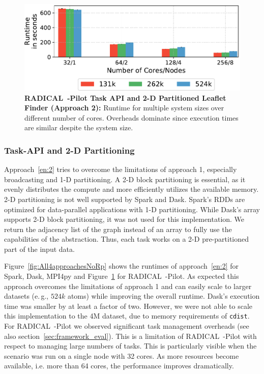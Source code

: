 

\begin{figure}[ht]
    \centering
    \includegraphics[width=.95\textwidth]{figures/data_analytics_hpc/task_par/rpLF.pdf}
    \caption{\textbf{RADICAL~-Pilot Task API and 2-D Partitioned Leaflet Finder (Approach 2):}
    Runtime for multiple system sizes over different number of cores.
    Overheads dominate since execution times are similar despite the system size.}
    \label{fig:rpLF}
\end{figure}

\subsubsection{Task-API and 2-D Partitioning}
Approach~\ref{en:2} tries to overcome the limitations of approach 1, especially broadcasting and 1-D partitioning.
A 2-D block partitioning is essential, as it evenly distributes the compute and more efficiently utilizes the available memory.
2-D partitioning is not well supported by Spark and Dask.
Spark's RDDs are optimized for data-parallel applications with 1-D partitioning.
While Dask's array supports 2-D block partitioning, it was not used for this implementation.
We return the adjacency list of the graph instead of an array to fully use the capabilities of the abstraction.
Thus, each task works on a 2-D pre-partitioned part of the input data.

Figure~\ref{fig:All4approachesNoRp} shows the runtimes of approach~\ref{en:2} for Spark, Dask, MPI4py and Figure~\ref{fig:rpLF} for RADICAL~-Pilot.
As expected this approach overcomes the limitations of approach 1 and can easily scale to larger datasets (e.\,g., $524k$ atoms) while improving the overall runtime.
Dask's execution time was smaller by at least a factor of two.
However, we were not able to scale this implementation to the 4M dataset, due to memory requirements of \texttt{cdist}.
For RADICAL~-Pilot we observed significant task management overheads (see also section~\ref{sec:framework_eval}).
This is a limitation of RADICAL~-Pilot with respect to managing large numbers of tasks.
This is particularly visible when the scenario was run on a single node with 32 cores.
As more resources become available, i.e. more than 64 cores, the performance improves dramatically.

